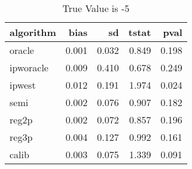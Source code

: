 \begin{table}[h!]

\caption{True Value is -5}
\centering
\begin{tabular}[t]{lrrrr}
\toprule
algorithm & bias & sd & tstat & pval\\
\midrule
oracle & 0.001 & 0.032 & 0.849 & 0.198\\
ipworacle & 0.009 & 0.410 & 0.678 & 0.249\\
ipwest & 0.012 & 0.191 & 1.974 & 0.024\\
semi & 0.002 & 0.076 & 0.907 & 0.182\\
reg2p & 0.002 & 0.072 & 0.857 & 0.196\\
\addlinespace
reg3p & 0.004 & 0.127 & 0.992 & 0.161\\
calib & 0.003 & 0.075 & 1.339 & 0.091\\
\bottomrule
\end{tabular}
\end{table}
